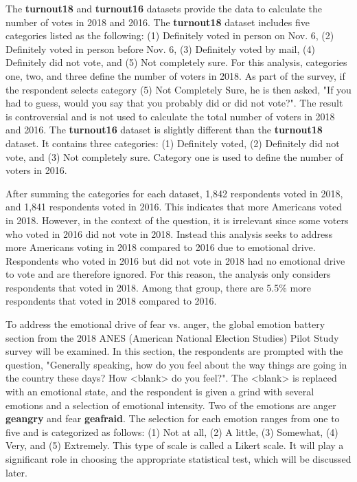 \documentclass[12pt]{article}
\begin{document}
The \textbf{turnout18} and \textbf{turnout16} datasets provide the data to calculate the number of votes in 2018 and 2016.  The \textbf{turnout18} dataset includes five categories listed as the following: (1) Definitely voted in person on Nov. 6, (2) Definitely voted in person before Nov. 6, (3) Definitely voted by mail, (4) Definitely did not vote, and (5) Not completely sure.  For this analysis, categories one, two, and three define the number of voters in 2018.  As part of the survey, if the respondent selects category (5) Not Completely Sure, he is then asked, "If you had to guess, would you say that you probably did or did not vote?".  The result is controversial and is not used to calculate the total number of voters in 2018 and 2016. The \textbf{turnout16} dataset is slightly different than the \textbf{turnout18} dataset.  It contains three categories: (1) Definitely voted, (2) Definitely did not vote, and (3) Not completely sure.  Category one is used to define the number of voters in 2016.  

 After summing the categories for each dataset, 1,842 respondents voted in 2018, and 1,841 respondents voted in 2016.  This indicates that more Americans voted in 2018.  However, in the context of the question, it is irrelevant since some voters who voted in 2016 did not vote in 2018.  Instead this analysis seeks to address more Americans voting in 2018 compared to 2016 due to emotional drive.  Respondents who voted in 2016 but did not vote in 2018 had no emotional drive to vote and are therefore ignored.  For this reason,  the analysis only considers respondents that voted in 2018.  Among that group, there are 5.5\% more respondents that voted in 2018 compared to 2016.   

To address the emotional drive of fear vs. anger, the global emotion battery section from the 2018 ANES (American National Election Studies) Pilot Study survey will be examined. In this section, the respondents are prompted with the question, "Generally speaking, how do you feel about the way things are going in the country these days?  How <blank> do you feel?".  The <blank> is replaced with an emotional state, and the respondent is given a grind with several emotions and a selection of emotional intensity. Two of the emotions are anger \textbf{geangry} and fear \textbf{geafraid}.  The selection for each emotion ranges from one to five and is categorized as follows: (1) Not at all, (2) A little, (3) Somewhat, (4) Very, and (5) Extremely. This type of scale is called a Likert scale. It will play a significant role in choosing the appropriate statistical test, which will be discussed later.
\end{document}
